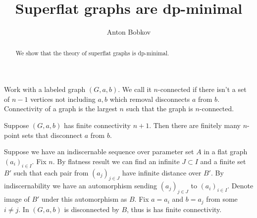 \documentclass{amsart}
\begin{document}
\title{Superflat graphs are dp-minimal}
\author{Anton Bobkov}

\begin{abstract}
	We show that the theory of superflat graphs is dp-minimal.
\end{abstract}

\maketitle

Work with a labeled graph $(G, a, b)$. We call it $n$-connected if there isn't a set of $n-1$ vertices not including $a,b$ which removal disconnects $a$ from $b$. Connectivity of a graph is the largest $n$ such that the graph is $n$-connected.

\begin{Lemma}
	Suppose $(G, a, b)$ has finite connectivity $n+1$. Then there are finitely many $n$-point sets that disconnect $a$ from $b$.
\end{Lemma}

Suppose we have an indiscernable sequence over parameter set $A$ in a flat graph $(a_i)_{i \in I}$. Fix $n$. By flatness result we can find an infinite $J \subset I$ and a finite set $B'$ such that each pair from $(a_j)_{j \in J}$ have infinite distance over $B'$. By indiscernability we have an automorphism sending $(a_j)_{j \in J}$ to $(a_i)_{i \in I}$. Denote image of $B'$ under this automorphism as $B$. Fix $a = a_i$ and $b = a_j$ from some $i \neq j$. In $(G, a, b)$ is disconnected by $B$, thus is has finite connectivity. 
\end{document}
